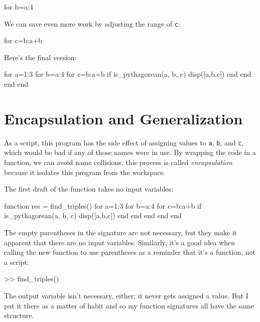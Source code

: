 \begin{code}
for b=a:4
\end{code}

We can save even more work by adjusting the range of \lstinline{c}:

\begin{code}
for c=b:a+b
\end{code}

Here's the final version:

\begin{code}
for a=1:3
    for b=a:4
        for c=b:a+b
            if is_pythagorean(a, b, c)
                disp([a,b,c])
            end
        end
    end
end
\end{code}

\section{Encapsulation and Generalization}

As a script, this program has the side effect of assigning values to
\lstinline{a}, \lstinline{b}, and \lstinline{c}, which would be bad if any of those names were in use.
By wrapping the code in a function, we can avoid name collisions; this process is called \emph{encapsulation} because it isolates this program from the workspace.


The first draft of the function takes no input variables:

\begin{code}
function res = find_triples()
    for a=1:3
        for b=a:4
            for c=b:a+b
                if is_pythagorean(a, b, c)
                    disp([a,b,c])
                end
            end
        end
    end
end
\end{code}

The empty parentheses in the signature are not necessary, but
they make it apparent that there are no input variables.  Similarly,
it's a good  idea when calling the new function to use parentheses as a reminder
that it's a function, not a script:

\begin{code}
>> find_triples()
\end{code}

The output variable isn't necessary, either; it
never gets assigned a value.  But I put it there as a matter of
habit and so my function signatures all have the same structure.

